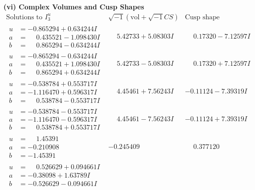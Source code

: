 \documentclass[1p]{elsarticle_modified}
\theoremstyle{definition}
\newcommand{\I}{\sqrt{-1}}
\begin{document}
\newpage\flushleft \textbf{(vi) Complex Volumes and Cusp Shapes}
$$\begin{array}{c|c|c}  
\text{Solutions to }I^u_{3}& \I (\text{vol} + \sqrt{-1}CS) & \text{Cusp shape}\\
 \hline 
\begin{aligned}
u &= -0.865294 + 0.634244 I \\
a &= \phantom{-}0.435521 - 1.098430 I \\
b &= \phantom{-}0.865294 - 0.634244 I\end{aligned}
 & \phantom{-}5.42733 + 5.08303 I & \phantom{-}0.17320 - 7.12597 I \\ \hline\begin{aligned}
u &= -0.865294 - 0.634244 I \\
a &= \phantom{-}0.435521 + 1.098430 I \\
b &= \phantom{-}0.865294 + 0.634244 I\end{aligned}
 & \phantom{-}5.42733 - 5.08303 I & \phantom{-}0.17320 + 7.12597 I \\ \hline\begin{aligned}
u &= -0.538784 + 0.553717 I \\
a &= -1.116470 + 0.596317 I \\
b &= \phantom{-}0.538784 - 0.553717 I\end{aligned}
 & \phantom{-}4.45461 + 7.56243 I & -0.11124 - 7.39319 I \\ \hline\begin{aligned}
u &= -0.538784 - 0.553717 I \\
a &= -1.116470 - 0.596317 I \\
b &= \phantom{-}0.538784 + 0.553717 I\end{aligned}
 & \phantom{-}4.45461 - 7.56243 I & -0.11124 + 7.39319 I \\ \hline\begin{aligned}
u &= \phantom{-}1.45391\phantom{ +0.000000I} \\
a &= -0.210908\phantom{ +0.000000I} \\
b &= -1.45391\phantom{ +0.000000I}\end{aligned}
 & -0.245409\phantom{ +0.000000I} & \phantom{-}0.377120\phantom{ +0.000000I} \\ \hline\begin{aligned}
u &= \phantom{-}0.526629 + 0.094661 I \\
a &= -0.38098 + 1.63789 I \\
b &= -0.526629 - 0.094661 I\end{aligned}

\end{array}$$
\end{document}
